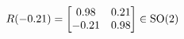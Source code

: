 \documentclass[preview]{standalone}
\begin{document}
\begin{align*}
\special{dvisvgm:raw <g id='unique000'>}R(-0.21) = \begin{bmatrix} 0.98 & 0.21 \\ -0.21 & 0.98 \end{bmatrix} \in \text{SO}(2)\special{dvisvgm:raw </g>}
\end{align*}
\end{document}
